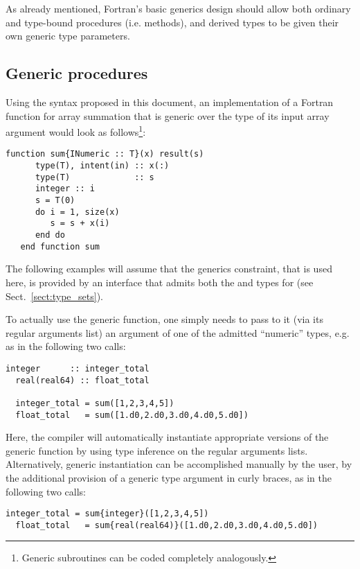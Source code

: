 \documentclass[11pt,oneside]{report}
\newcommand{\code}[1]{{\selectfont\ttfamily{#1}}}
\begin{document}
As already mentioned, Fortran's basic generics design should allow
both ordinary and type-bound procedures (i.e. methods), and derived
types to be given their own generic type parameters.

\subsection{Generic procedures}
\label{sect:generic_procedures}

Using the syntax proposed in this document, an implementation of a
Fortran function for array summation that is generic over the type of
its input array argument would look as follows\footnote{Generic
subroutines can be coded completely analogously.}:
\begin{lstlisting}[language=LFortran,style=boxed]
   function sum{INumeric :: T}(x) result(s)
      type(T), intent(in) :: x(:)
      type(T)             :: s
      integer :: i
      s = T(0)
      do i = 1, size(x)
         s = s + x(i)
      end do
   end function sum
\end{lstlisting}
The following examples will assume that the \code{INumeric} generics
constraint, that is used here, is provided by an interface that admits
both the \code{integer} and \code{real(real64)} types for \code{T}
(see Sect.~\ref{sect:type_sets}).

To actually use the \code{sum} generic function, one simply needs to
pass to it (via its regular arguments list) an argument of one of
the admitted ``numeric'' types, e.g. as in the following two calls:
\begin{lstlisting}[language=LFortran,style=boxed]
  integer      :: integer_total
  real(real64) :: float_total
  
  integer_total = sum([1,2,3,4,5])
  float_total   = sum([1.d0,2.d0,3.d0,4.d0,5.d0])
\end{lstlisting}
Here, the compiler will automatically instantiate appropriate versions
of the \code{sum} generic function by using type inference on the
regular arguments lists. Alternatively, generic instantiation can be
accomplished manually by the user, by the additional provision of a
generic type argument in curly braces, as in the following two calls:
\begin{lstlisting}[language=LFortran,style=boxed]
  integer_total = sum{integer}([1,2,3,4,5])
  float_total   = sum{real(real64)}([1.d0,2.d0,3.d0,4.d0,5.d0])
\end{lstlisting}
\end{document}
